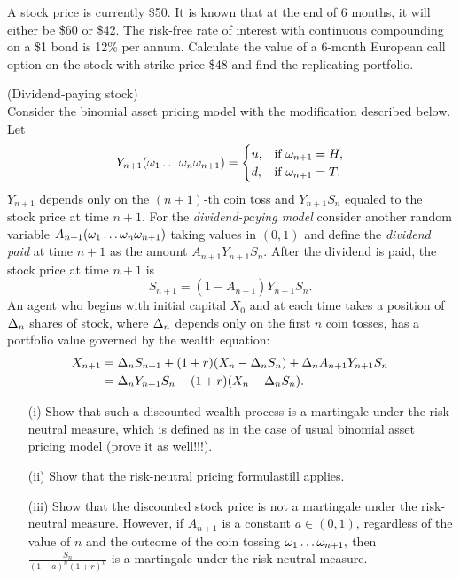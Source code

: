 \begin{problem}
 A stock price is currently \$50.  It is known that at the end of 6
  months, it will either be \$60 or \$42.  The risk-free rate of
  interest with continuous compounding on a \$1 bond is 12\% per annum.
  Calculate the value of a 6-month European call option on the stock
  with strike price \$48 and find the replicating portfolio.

\begin{sol}

\end{sol}
\end{problem}

\begin{problem}
 (Dividend-paying stock) \\
Consider the binomial asset pricing model
with the modification described below. Let
\[
Y_{n+1}(\omega_1\dots\omega_n\omega_{n+1})=
\begin{cases}
u,&\text{if }\omega_{n+1}=H,\\
d,&\text{if }\omega_{n+1}=T.
\end{cases}
\]
\ni $Y_{n+1}$ depends only on the $(n+1)$-th coin toss and $Y_{n+1}S_n$ equaled to the
stock price at time $n+1$. For the \emph{dividend-paying model} consider another random
variable $A_{n+1}(\omega_1\dots\omega_n\omega_{n+1})$ taking values in $(0,1)$ and define
the \emph{dividend paid} at time $n+1$ as the amount $A_{n+1}Y_{n+1}S_n.$ After the dividend
is paid, the stock price at time $n+1$ is
\[
S_{n+1}=(1-A_{n+1})Y_{n+1}S_n.
\]
\ni An agent who begins with initial capital $X_0$ and at each time takes a position of
$\Delta_n$ shares of stock, where $\Delta_n$ depends only on the first $n$ coin tosses, has
a portfolio value governed by the wealth equation:
\begin{align}
X_{n+1}&=\Delta_n S_{n+1}+(1+r) (X_n-\Delta_n S_n) +\Delta_n A_{n+1} Y_{n+1} S_n \\
&=\Delta_n Y_{n+1} S_n+(1+r)(X_n-\Delta_n S_n).
\end{align}
\begin{itemize}
\item[(i)] Show that such a discounted wealth process is a martingale under the
risk-neutral measure, which is defined as in the case of usual binomial asset pricing model
(prove it as well!!!).

\item[(ii)] Show that the risk-neutral pricing formulastill applies.

\item[(iii)] Show that the discounted stock price is not a martingale under the
risk-neutral measure. However, if $A_{n+1}$ is a constant $a\in(0,1)$, regardless of the value of
$n$  and the outcome of the coin tossing $\omega_1\dots\omega_{n+1},$ then $\frac{S_n}{(1-a)^n(1+r)^n}$ is
a martingale under the risk-neutral measure.
\end{itemize}

\begin{sol}

\end{sol}
\end{problem}

